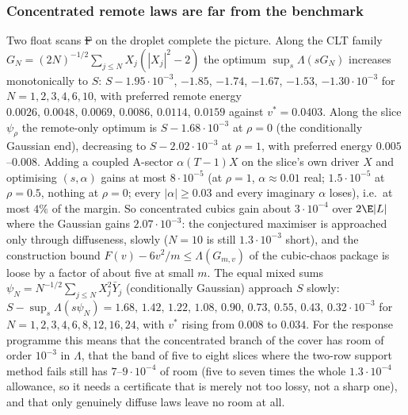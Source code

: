 \subsubsection{Concentrated remote laws are far from the benchmark}
Two float scans \st{F} on the droplet complete the picture. Along the
CLT family $G_N=(2N)^{-1/2}\sum_{j\le N}X_j(|X_j|^2-2)$ the optimum
$\sup_s\Lambda(sG_N)$ increases monotonically to $S$:
$S-1.95\cdot10^{-3}$, $-1.85$, $-1.74$, $-1.67$, $-1.53$,
$-1.30\cdot10^{-3}$ for $N=1,2,3,4,6,10$, with preferred remote energy
$0.0026,\,0.0048,\,0.0069,\,0.0086,\,0.0114,\,0.0159$ against
$v^*=0.0403$. Along the slice $\psi_\rho$ the remote-only optimum is
$S-1.68\cdot10^{-3}$ at $\rho=0$ (the conditionally Gaussian end),
decreasing to $S-2.02\cdot10^{-3}$ at $\rho=1$, with preferred energy
$0.005$--$0.008$. Adding a coupled A-sector $\alpha(T-1)X$ on the slice's own driver $X$ and optimising $(s,\alpha)$ gains at most $8\cdot10^{-5}$ (at $\rho=1$, $\alpha\approx0.01$ real; $1.5\cdot10^{-5}$ at $\rho=0.5$, nothing at $\rho=0$; every $|\alpha|\ge0.03$ and every imaginary $\alpha$ loses), i.e.\ at most $4\%$ of the margin. So concentrated cubics gain about $3\cdot10^{-4}$
over $2\E|L|$ where the Gaussian gains $2.07\cdot10^{-3}$: the
conjectured maximiser is approached only through diffuseness, slowly
($N=10$ is still $1.3\cdot10^{-3}$ short), and the construction bound
$F(v)-6v^2/m\le\Lambda(G_{m,v})$ of the cubic-chaos package is loose by
a factor of about five at small $m$. The equal mixed sums $\psi_N=N^{-1/2}\sum_{j\le N}X_j^2\bar Y_j$ (conditionally Gaussian) approach $S$ slowly:
$S-\sup_s\Lambda(s\psi_N)=1.68,\,1.42,\,1.22,\,1.08,\,0.90,\,0.73,\,0.55,\,0.43,\,0.32\cdot10^{-3}$
for $N=1,2,3,4,6,8,12,16,24$, with $v^*$ rising from $0.008$ to $0.034$. For the response programme this
means that the concentrated branch of the cover has room of order
$10^{-3}$ in $\Lambda$, that the band of five to eight slices where the two-row support method fails still has
$7$--$9\cdot10^{-4}$ of room (five to seven times the whole $1.3\cdot10^{-4}$ allowance, so it needs a certificate that is merely not
too lossy, not a sharp one), and that only genuinely diffuse laws leave no room at all.

